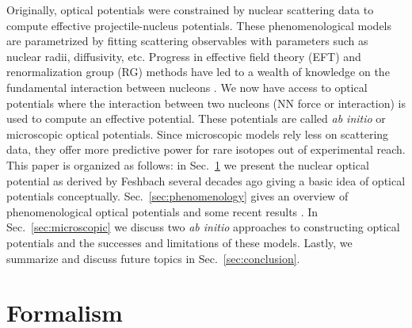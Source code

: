 \documentclass[preprintnumbers,floatfix,aps,prc,preprint,nofootinbib]{revtex4-1}
\begin{document}
Originally, optical potentials were constrained by nuclear scattering data to compute effective projectile-nucleus potentials. These phenomenological models are parametrized by fitting scattering observables with parameters such as nuclear radii, diffusivity, etc. Progress in effective field theory (EFT) and renormalization group (RG) methods have led to a wealth of knowledge on the fundamental interaction between nucleons \cite{Epelbaum:2008ga}. We now have access to optical potentials where the interaction between two nucleons (NN force or interaction) is used to compute an effective potential. These potentials are called \textit{ab initio} or microscopic optical potentials. Since microscopic models rely less on scattering data, they offer more predictive power for rare isotopes out of experimental reach.
\\

This paper is organized as follows: in Sec.~\ref{sec:formalism} we present the nuclear optical potential as derived by Feshbach several decades ago \cite{Feshbach:1958nx, Feshbach:1962ut} giving a basic idea of optical potentials conceptually. Sec.~\ref{sec:phenomenology} gives an overview of phenomenological optical potentials and some recent results \cite{Koning:2003zz}. In Sec.~\ref{sec:microscopic} we discuss two \textit{ab initio} approaches to constructing optical potentials and the successes and limitations of these models. Lastly, we summarize and discuss future topics in Sec.~\ref{sec:conclusion}.


\section{Formalism}
\label{sec:formalism}
\end{document}
